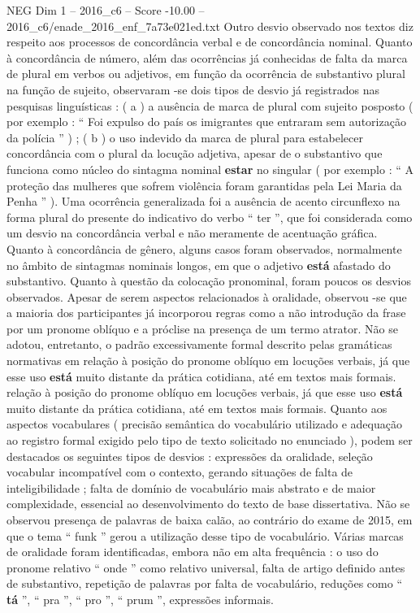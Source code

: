 \begin{textsample}{NEG Dim 1 – 2016\_c6 – Score -10.00 – 2016\_c6/enade\_2016\_enf\_7a73e021ed.txt}
Outro desvio observado nos textos diz respeito aos processos de concordância verbal e de concordância nominal.
Quanto à concordância de número, além das ocorrências já conhecidas de falta da marca de plural em verbos ou adjetivos, em função da ocorrência de substantivo plural na função de sujeito, observaram -se dois tipos de desvio já registrados nas pesquisas linguísticas : ( a ) a ausência de marca de plural com sujeito posposto ( por exemplo : “ Foi expulso do país os imigrantes que entraram sem autorização da polícia ” ) ; ( b ) o uso indevido da marca de plural para estabelecer concordância com o plural da locução adjetiva, apesar de o substantivo que funciona como núcleo do sintagma nominal \textbf{estar} no singular ( por exemplo : “ A proteção das mulheres que sofrem violência foram garantidas pela Lei Maria da Penha ” ).
Uma ocorrência generalizada foi a ausência de acento circunflexo na forma plural do presente do indicativo do verbo “ ter ”, que foi considerada como um desvio na concordância verbal e não meramente de acentuação gráfica.
Quanto à concordância de gênero, alguns casos foram observados, normalmente no âmbito de sintagmas nominais longos, em que o adjetivo \textbf{está} afastado do substantivo.
Quanto à questão da colocação pronominal, foram poucos os desvios observados.
Apesar de serem aspectos relacionados à oralidade, observou -se que a maioria dos participantes já incorporou regras como a não introdução da frase por um pronome oblíquo e a próclise na presença de um termo atrator.
Não se adotou, entretanto, o padrão excessivamente formal descrito pelas gramáticas normativas em relação à posição do pronome oblíquo em locuções verbais, já que esse uso \textbf{está} muito distante da prática cotidiana, até em textos mais formais. relação à posição do pronome oblíquo em locuções verbais, já que esse uso \textbf{está} muito distante da prática cotidiana, até em textos mais formais.
Quanto aos aspectos vocabulares ( precisão semântica do vocabulário utilizado e adequação ao registro formal exigido pelo tipo de texto solicitado no enunciado ), podem ser destacados os seguintes tipos de desvios : expressões da oralidade, seleção vocabular incompatível com o contexto, gerando situações de falta de inteligibilidade ; falta de domínio de vocabulário mais abstrato e de maior complexidade, essencial ao desenvolvimento do texto de base dissertativa.
Não se observou presença de palavras de baixa calão, ao contrário do exame de 2015, em que o tema “ funk ” gerou a utilização desse tipo de vocabulário.
Várias marcas de oralidade foram identificadas, embora não em alta frequência : o uso do pronome relativo “ onde ” como relativo universal, falta de artigo definido antes de substantivo, repetição de palavras por falta de vocabulário, reduções como “ \textbf{tá} ”, “ pra ”, “ pro ”, “ prum ”, expressões informais.

\end{textsample}
